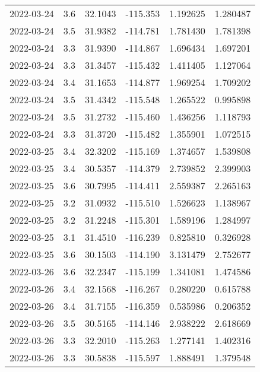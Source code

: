 \begin{tabular}{lrrrrr}
2022-03-24 &       3.6 &  32.1043 &  -115.353 &         1.192625 &         1.280487 \\
2022-03-24 &       3.5 &  31.9382 &  -114.781 &         1.781430 &         1.781398 \\
2022-03-24 &       3.3 &  31.9390 &  -114.867 &         1.696434 &         1.697201 \\
2022-03-24 &       3.3 &  31.3457 &  -115.432 &         1.411405 &         1.127064 \\
2022-03-24 &       3.4 &  31.1653 &  -114.877 &         1.969254 &         1.709202 \\
2022-03-24 &       3.5 &  31.4342 &  -115.548 &         1.265522 &         0.995898 \\
2022-03-24 &       3.5 &  31.2732 &  -115.460 &         1.436256 &         1.118793 \\
2022-03-24 &       3.3 &  31.3720 &  -115.482 &         1.355901 &         1.072515 \\
2022-03-25 &       3.4 &  32.3202 &  -115.169 &         1.374657 &         1.539808 \\
2022-03-25 &       3.4 &  30.5357 &  -114.379 &         2.739852 &         2.399903 \\
2022-03-25 &       3.6 &  30.7995 &  -114.411 &         2.559387 &         2.265163 \\
2022-03-25 &       3.2 &  31.0932 &  -115.510 &         1.526623 &         1.138967 \\
2022-03-25 &       3.2 &  31.2248 &  -115.301 &         1.589196 &         1.284997 \\
2022-03-25 &       3.1 &  31.4510 &  -116.239 &         0.825810 &         0.326928 \\
2022-03-25 &       3.6 &  30.1503 &  -114.190 &         3.131479 &         2.752677 \\
2022-03-26 &       3.6 &  32.2347 &  -115.199 &         1.341081 &         1.474586 \\
2022-03-26 &       3.4 &  32.1568 &  -116.267 &         0.280220 &         0.615788 \\
2022-03-26 &       3.4 &  31.7155 &  -116.359 &         0.535986 &         0.206352 \\
2022-03-26 &       3.5 &  30.5165 &  -114.146 &         2.938222 &         2.618669 \\
2022-03-26 &       3.3 &  32.2010 &  -115.263 &         1.277141 &         1.402316 \\
2022-03-26 &       3.3 &  30.5838 &  -115.597 &         1.888491 &         1.379548 \\

\end{tabular}
